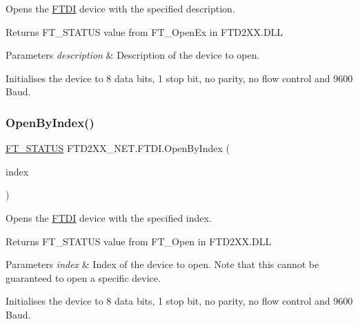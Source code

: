 Opens the \mbox{\hyperlink{class_f_t_d2_x_x___n_e_t_1_1_f_t_d_i}{F\+T\+DI}} device with the specified description. 

\begin{DoxyReturn}{Returns}
F\+T\+\_\+\+S\+T\+A\+T\+US value from F\+T\+\_\+\+Open\+Ex in F\+T\+D2\+X\+X.\+D\+LL
\end{DoxyReturn}

\begin{DoxyParams}{Parameters}
{\em description} & Description of the device to open.\\
\hline
\end{DoxyParams}


Initialises the device to 8 data bits, 1 stop bit, no parity, no flow control and 9600 Baud.\mbox{\label{class_f_t_d2_x_x___n_e_t_1_1_f_t_d_i_a5327412a6aa103c747e9d47b02f3649c}} 
\subsubsection{\texorpdfstring{OpenByIndex()}{OpenByIndex()}}
{\footnotesize\ttfamily \mbox{\hyperlink{class_f_t_d2_x_x___n_e_t_1_1_f_t_d_i_aabe20ad905cc4ccc1e35dd5b877d9a83}{F\+T\+\_\+\+S\+T\+A\+T\+US}} F\+T\+D2\+X\+X\+\_\+\+N\+E\+T.\+F\+T\+D\+I.\+Open\+By\+Index (\begin{DoxyParamCaption}\item[{U\+Int32}]{index }\end{DoxyParamCaption})}



Opens the \mbox{\hyperlink{class_f_t_d2_x_x___n_e_t_1_1_f_t_d_i}{F\+T\+DI}} device with the specified index. 

\begin{DoxyReturn}{Returns}
F\+T\+\_\+\+S\+T\+A\+T\+US value from F\+T\+\_\+\+Open in F\+T\+D2\+X\+X.\+D\+LL
\end{DoxyReturn}

\begin{DoxyParams}{Parameters}
{\em index} & Index of the device to open. Note that this cannot be guaranteed to open a specific device.\\
\hline
\end{DoxyParams}


Initialises the device to 8 data bits, 1 stop bit, no parity, no flow control and 9600 Baud.\mbox{\label{class_f_t_d2_x_x___n_e_t_1_1_f_t_d_i_ab6a4d39b5e88b513e2a8f588bdd9481e}} 
